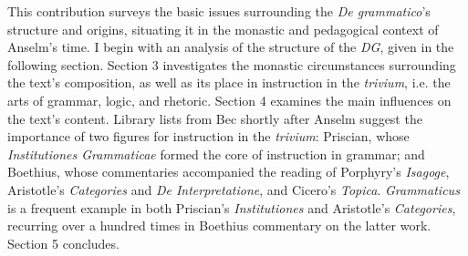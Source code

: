 \documentclass[]{article}
\begin{document}
This contribution surveys the basic issues surrounding the \textit{De grammatico}'s structure and origins, situating it in the monastic and pedagogical context of Anselm's time. I begin with an analysis of the structure of the \textit{DG}, given in the following section. Section 3 investigates the monastic circumstances surrounding the text's composition, as well as its place in instruction in the \textit{trivium}, i.e. the arts of grammar, logic, and rhetoric. Section 4 examines the main influences on the text's content. Library lists from Bec shortly after Anselm suggest the importance of two figures for instruction in the \textit{trivium}: Priscian, whose \textit{Institutiones Grammaticae} formed the core of instruction in grammar; and Boethius, whose commentaries accompanied the reading of Porphyry's \textit{Isagoge}, Aristotle's \textit{Categories} and \textit{De Interpretatione}, and Cicero's \textit{Topica}. \textit{Grammaticus} is a frequent example in both Priscian's \textit{Institutiones} and Aristotle's \textit{Categories}, recurring over a hundred times in Boethius commentary on the latter work. Section 5 concludes.
\end{document}
